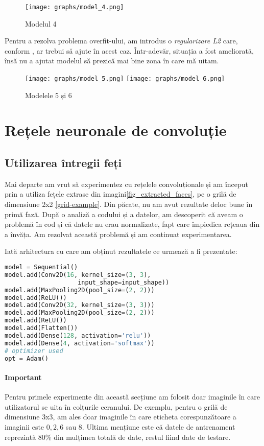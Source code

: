 \begin{figure}[h]
    \centering
    \texttt{[image: graphs/model\_4.png]}
    \caption{Modelul 4}
\end{figure}


Pentru a rezolva problema overfit-ului, am introdus o \emph{regularizare L2} care, conform \cite{l1_l2_regularisation}, ar trebui să ajute în acest caz.
Într-adevăr, situația a fost ameliorată, însă nu a ajutat modelul să prezică mai bine zona în care mă uitam.

\begin{figure}[h]
    \centering
    \texttt{[image: graphs/model\_5.png]}
    \texttt{[image: graphs/model\_6.png]}
    \caption{Modelele 5 și 6}
\end{figure}


\section{Rețele neuronale de convoluție}
\subsection{Utilizarea întregii feți}

Mai departe am vrut să experimentez cu rețelele convoluționale și am început prin a utiliza fețele extrase din imagini\ref{fig_extracted_faces}, pe o grilă de dimensiune 2x2 \ref{grid-example}.
Din păcate, nu am avut rezultate deloc bune în primă fază.
După o analiză a codului și a datelor, am descoperit că aveam o problemă în cod și că datele nu erau normalizate, fapt care împiedica rețeaua din a învăța.
Am rezolvat această problemă și am continuat experimentarea.


Iată arhitectura cu care am obținut rezultatele ce urmează a fi prezentate:

\label{cnn_first_architecture}
\begin{lstlisting}[language=Python, caption=Prima arhitectură CNN]
model = Sequential()
model.add(Conv2D(16, kernel_size=(3, 3),
                    input_shape=input_shape))
model.add(MaxPooling2D(pool_size=(2, 2)))
model.add(ReLU())
model.add(Conv2D(32, kernel_size=(3, 3)))
model.add(MaxPooling2D(pool_size=(2, 2)))
model.add(ReLU())
model.add(Flatten())
model.add(Dense(128, activation='relu'))
model.add(Dense(4, activation='softmax'))
# optimizer used
opt = Adam()
\end{lstlisting}

\paragraph{Important}
Pentru primele experimente din această secțiune am folosit doar imaginile în care utilizatorul se uita în colțurile ecranului.
De exemplu, pentru o grilă de dimensiune 3x3, am ales doar imaginile în care eticheta corespunzătoare a imaginii este $0, 2, 6$ sau $8$.
Ultima mențiune este că datele de antrenament reprezintă $80\%$ din mulțimea totală de date, restul fiind date de testare.


